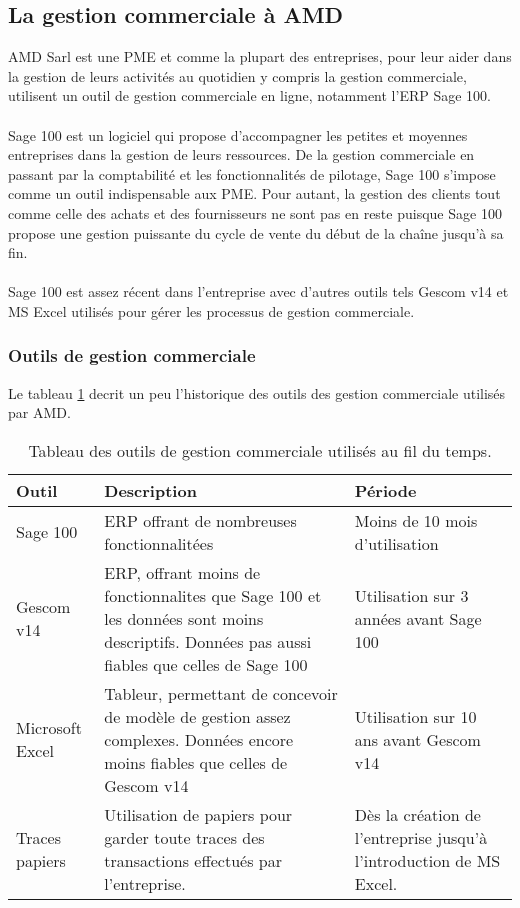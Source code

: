 \subsection{La gestion commerciale à AMD}
AMD Sarl est une PME et comme la plupart des entreprises, pour leur aider dans la gestion de leurs activités au quotidien y compris la gestion commerciale, utilisent un outil de gestion commerciale en ligne, notamment l’ERP Sage 100.
\paragraph{}
Sage 100 est un logiciel qui propose d’accompagner les petites et moyennes entreprises dans la gestion de leurs ressources. De la gestion commerciale en passant par la comptabilité et les fonctionnalités de pilotage, Sage 100 s’impose comme un outil indispensable aux PME. Pour autant, la gestion des clients tout comme celle des achats et des fournisseurs ne sont pas en reste puisque Sage 100 propose une gestion puissante du cycle de vente du début de la chaîne jusqu’à sa fin.
\paragraph{}
Sage 100 est assez récent dans l’entreprise avec d’autres outils tels Gescom v14 et MS Excel utilisés pour gérer les processus de gestion commerciale. 

\subsubsection{Outils de gestion commerciale}
Le tableau \ref{tab:outilsdegescom} decrit un peu l'historique des outils des gestion commerciale utilisés par AMD.

\begin{table}[H]
    \centering
    \caption{Tableau des outils de gestion commerciale utilisés au fil du temps.}
    \begin{tabular}[t]{|p{3cm}|p{7cm}|p{5cm}|} 
        \hline
        \textbf{Outil} & \textbf{Description} & \textbf{Période} \\
        \hline\hline
        Sage 100 & ERP offrant de nombreuses fonctionnalitées & Moins de 10 mois d'utilisation \\
        \hline
        Gescom v14 & ERP, offrant moins de fonctionnalites que Sage 100 et les données sont moins descriptifs. Données pas aussi  fiables que celles de Sage 100  & Utilisation sur 3 années avant Sage 100 \\ 
        \hline
        Microsoft Excel & Tableur, permettant de concevoir de modèle de gestion assez complexes. Données encore moins fiables que celles de Gescom v14 & Utilisation sur 10 ans avant Gescom v14 \\ 
        \hline
        Traces papiers & Utilisation de papiers pour garder toute traces des transactions effectués par l’entreprise. & Dès la création de l’entreprise jusqu’à l’introduction de MS Excel. \\ 
        \hline\hline
    \end{tabular}
    \label{tab:outilsdegescom}
\end{table}%

